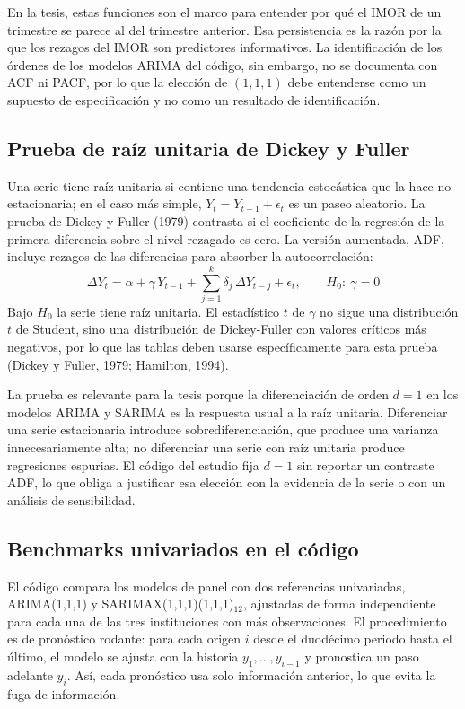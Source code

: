 En la tesis, estas funciones son el marco para entender por qué el IMOR de un trimestre se parece al del trimestre anterior. Esa persistencia es la razón por la que los rezagos del IMOR son predictores informativos. La identificación de los órdenes de los modelos ARIMA del código, sin embargo, no se documenta con ACF ni PACF, por lo que la elección de $(1,1,1)$ debe entenderse como un supuesto de especificación y no como un resultado de identificación.

\subsection{Prueba de raíz unitaria de Dickey y Fuller}
Una serie tiene raíz unitaria si contiene una tendencia estocástica que la hace no estacionaria; en el caso más simple, $Y_t=Y_{t-1}+\epsilon_t$ es un paseo aleatorio. La prueba de Dickey y Fuller (1979) contrasta si el coeficiente de la regresión de la primera diferencia sobre el nivel rezagado es cero. La versión aumentada, ADF, incluye rezagos de las diferencias para absorber la autocorrelación:
\begin{equation}
\Delta Y_t=\alpha+\gamma\,Y_{t-1}+\sum_{j=1}^{k}\delta_j\,\Delta Y_{t-j}+\epsilon_t, \qquad H_0:\ \gamma=0
\label{eq:adf}
\end{equation}
Bajo $H_0$ la serie tiene raíz unitaria. El estadístico $t$ de $\gamma$ no sigue una distribución $t$ de Student, sino una distribución de Dickey-Fuller con valores críticos más negativos, por lo que las tablas deben usarse específicamente para esta prueba (Dickey y Fuller, 1979; Hamilton, 1994).

La prueba es relevante para la tesis porque la diferenciación de orden $d=1$ en los modelos ARIMA y SARIMA es la respuesta usual a la raíz unitaria. Diferenciar una serie estacionaria introduce sobrediferenciación, que produce una varianza innecesariamente alta; no diferenciar una serie con raíz unitaria produce regresiones espurias. El código del estudio fija $d=1$ sin reportar un contraste ADF, lo que obliga a justificar esa elección con la evidencia de la serie o con un análisis de sensibilidad.

\subsection{Benchmarks univariados en el código}
El código compara los modelos de panel con dos referencias univariadas, ARIMA(1,1,1) y SARIMAX(1,1,1)(1,1,1)$_{12}$, ajustadas de forma independiente para cada una de las tres instituciones con más observaciones. El procedimiento es de pronóstico rodante: para cada origen $i$ desde el duodécimo periodo hasta el último, el modelo se ajusta con la historia $y_1,\dots,y_{i-1}$ y pronostica un paso adelante $y_i$. Así, cada pronóstico usa solo información anterior, lo que evita la fuga de información.

